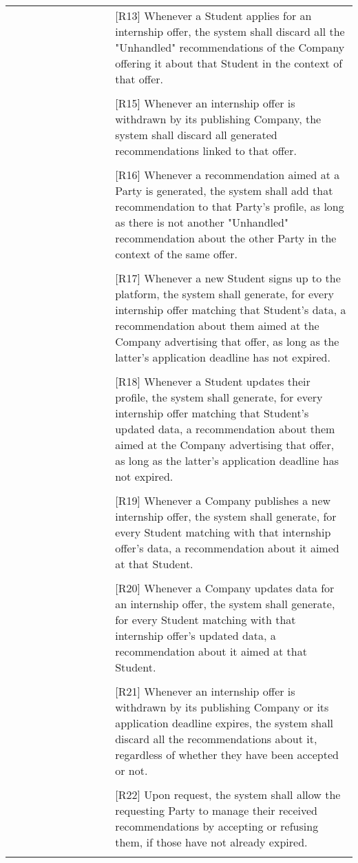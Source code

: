 \begin{center}
\begin{longtable}{p{0.3\linewidth}p{0.7\linewidth}}
        & [R13] Whenever a Student applies for an internship offer, the system shall discard all the "Unhandled" recommendations of the Company offering it about that Student in the context of that offer. \\ \\
        & [R15] Whenever an internship offer is withdrawn by its publishing Company, the system shall discard all generated recommendations linked to that offer. \\ \\
        & [R16] Whenever a recommendation aimed at a Party is generated, the system shall add that recommendation to that Party’s profile, as long as there is not another "Unhandled" recommendation about the other Party in the context of the same offer. \\ \\
        & [R17] Whenever a new Student signs up to the platform, the system shall generate, for every internship offer matching that Student’s data, a recommendation about them aimed at the Company advertising that offer, as long as the latter’s application deadline has not expired. \\ \\
        & [R18] Whenever a Student updates their profile, the system shall generate, for every internship offer matching that Student’s updated data, a recommendation about them aimed at the Company advertising that offer, as long as the latter’s application deadline has not expired. \\ \\
        & [R19] Whenever a Company publishes a new internship offer, the system shall generate, for every Student matching with that internship offer’s data, a recommendation about it aimed at that Student. \\ \\
        & [R20] Whenever a Company updates data for an internship offer, the system shall generate, for every Student matching with that internship offer’s updated data, a recommendation about it aimed at that Student. \\ \\
        & [R21] Whenever an internship offer is withdrawn by its publishing Company or its application deadline expires, the system shall discard all the recommendations about it, regardless of whether they have been accepted or not. \\ \\
        & [R22] Upon request, the system shall allow the requesting Party to manage their received recommendations by accepting or refusing them, if those have not already expired. \\ \\

\end{longtable}
\end{center}
